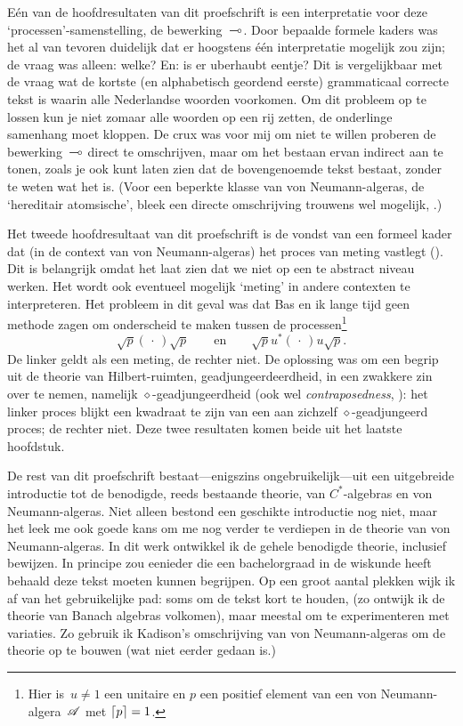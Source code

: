 \documentclass[b5paper]{book}
\begin{document}
E\'en van de hoofdresultaten van dit proefschrift
is een interpretatie voor deze `processen'-samenstelling,
de bewerking~$\mathbin{\multimap}$.
Door bepaalde formele kaders
was het al van tevoren duidelijk dat er hoogstens \'e\'en
interpretatie mogelijk zou zijn;
de vraag was alleen: welke?  En: is er uberhaubt eentje?
Dit is vergelijkbaar met de vraag wat de kortste (en alphabetisch geordend
eerste)
grammaticaal
correcte tekst is waarin
alle Nederlandse woorden voorkomen. 
Om dit probleem op te lossen kun je niet zomaar alle woorden
op een rij zetten, de onderlinge samenhang moet kloppen.
De crux was voor mij om niet te willen proberen de bewerking~$\mathbin{\multimap}$ 
direct te omschrijven,
maar om het bestaan ervan indirect aan te tonen,
zoals je ook kunt laten zien dat de  bovengenoemde tekst bestaat,
zonder te weten wat het is.
(Voor een beperkte klasse van
von Neumann-algeras, de `hereditair atomsische', bleek een
directe omschrijving trouwens wel mogelijk, .)

Het tweede hoofdresultaat van dit proefschrift
is de vondst van een formeel kader dat 
(in de context van von Neumann-algeras) het proces
van meting vastlegt ().
Dit is belangrijk omdat het laat zien dat we
niet op een te abstract niveau werken.
Het wordt ook eventueel
mogelijk `meting' in andere contexten te interpreteren.
Het probleem in dit geval was dat Bas en ik lange tijd geen methode zagen
om onderscheid te maken tussen de processen\footnote{Hier is~$u\neq 1$
een  unitaire
en 
$p$ een positief element van een von Neumann-algera~$\mathscr{A}$
met $\left\lceil p\right\rceil=1$.}
\begin{equation*}
\sqrt{p}(\,\cdot\,)\sqrt{p}\qquad\text{en}\qquad
\sqrt{p}u^*(\,\cdot\,)u \sqrt{p}.
\end{equation*}
De linker geldt als een meting, de rechter niet.
De oplossing was om een begrip uit de theorie van Hilbert-ruimten,
geadjungeerdeerdheid,
in een zwakkere zin over te nemen, namelijk $\diamond$-geadjungeerdheid 
(ook wel \emph{contraposedness}, ):
het linker proces blijkt een kwadraat te zijn van een aan zichzelf
$\diamond$-geadjungeerd proces; de rechter niet.
Deze twee resultaten komen beide uit het laatste hoofdstuk.

De rest van dit proefschrift bestaat---enigszins ongebruikelijk---uit 
een uitgebreide introductie
tot de benodigde, reeds bestaande theorie,
van $C^*$-algebras en von Neumann-algeras.
Niet alleen bestond
een geschikte introductie nog niet, maar het leek me ook goede kans 
om me nog verder te verdiepen in de theorie van von Neumann-algeras.
In dit werk ontwikkel ik de gehele benodigde theorie, inclusief 
bewijzen.
In principe zou eenieder die een bachelorgraad in de wiskunde heeft 
behaald deze tekst moeten kunnen begrijpen.
Op een groot aantal plekken wijk ik af van 
het gebruikelijke pad:
soms om de tekst kort te houden, (zo ontwijk ik de
theorie van Banach algebras volkomen),
maar meestal om te experimenteren met variaties.
Zo gebruik ik Kadison's omschrijving
van von Neumann-algeras om
de theorie op te bouwen (wat niet eerder gedaan is.)
\end{document}
